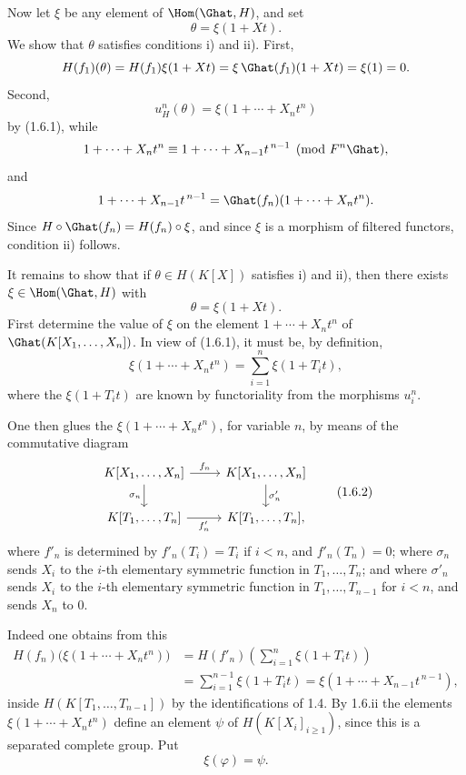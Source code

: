 Now let \(\xi\) be any element of \(\Hom(\Ghat,H)\), and set
\[
  \theta=\xi(1+Xt).
\]
We show that \(\theta\) satisfies conditions i) and ii). First,
\[
  H(f_1)(\theta)=H(f_1)\xi(1+Xt)
  =\xi\,\Ghat(f_1)(1+Xt)=\xi(1)=0.
\]
Second,
\[
  u_H^n(\theta)=\xi(1+\cdots+X_nt^n)
\]
by (1.6.1), while
\[
  1+\cdots+X_nt^n\equiv 1+\cdots+X_{n-1}t^{\,n-1}
  \pmod{F^n\Ghat},
\]
and
\[
  1+\cdots+X_{n-1}t^{\,n-1}=\Ghat(f_n)(1+\cdots+X_nt^n).
\]
Since \(H\circ \Ghat(f_n)=H(f_n)\circ \xi\), and since \(\xi\) is a morphism of filtered functors, condition ii) follows.

It remains to show that if \(\theta\in H(K[X])\) satisfies i) and ii), then there exists \(\xi\in\Hom(\Ghat,H)\) with
\[
  \theta=\xi(1+Xt).
\]
First determine the value of \(\xi\) on the element \(1+\cdots+X_nt^n\) of \(\Ghat(K[X_1,\ldots,X_n])\). In view of (1.6.1), it must be, by definition,
\[
  \xi(1+\cdots+X_nt^n)
  =
  \sum_{i=1}^n \xi(1+T_it),
\]
where the \(\xi(1+T_it)\) are known by functoriality from the morphisms \(u_i^n\).

One then glues the \(\xi(1+\cdots+X_nt^n)\), for variable \(n\), by means of the commutative diagram
\[
\begin{tikzcd}
K[X_1,\ldots,X_n] \arrow[r,"f_n"] \arrow[d,"\sigma_n"'] &
K[X_1,\ldots,X_n] \arrow[d,"\sigma'_n"]\\
K[T_1,\ldots,T_n] \arrow[r,"f'_n"'] &
K[T_1,\ldots,T_n],
\end{tikzcd}
\tag{1.6.2}
\]
where \(f'_n\) is determined by \(f'_n(T_i)=T_i\) if \(i<n\), and \(f'_n(T_n)=0\); where \(\sigma_n\) sends \(X_i\) to the \(i\)-th elementary symmetric function in \(T_1,\ldots,T_n\); and where \(\sigma'_n\) sends \(X_i\) to the \(i\)-th elementary symmetric function in \(T_1,\ldots,T_{n-1}\) for \(i<n\), and sends \(X_n\) to \(0\).

Indeed one obtains from this
\[
\begin{aligned}
H(f_n)\bigl(\xi(1+\cdots+X_nt^n)\bigr)
&=H(f'_n)\left(\sum_{i=1}^n \xi(1+T_it)\right)\\
&=\sum_{i=1}^{n-1}\xi(1+T_it)
   =\xi(1+\cdots+X_{n-1}t^{\,n-1}),
\end{aligned}
\]
inside \(H(K[T_1,\ldots,T_{n-1}])\) by the identifications of 1.4. By 1.6.ii the elements \(\xi(1+\cdots+X_nt^n)\) define an element \(\psi\) of \(H(K[X_i]_{i\geq 1})\), since this is a separated complete group. Put
\[
  \xi(\varphi)=\psi .
\]

